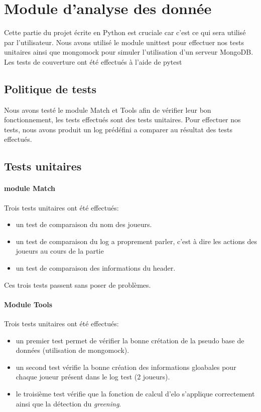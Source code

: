 \section{Module d'analyse des donnée}
Cette partie du projet écrite en Python est cruciale car c'est ce qui sera utilisé par l'utilisateur. Nous avons utilisé le module unittest pour effectuer nos tests unitaires ainsi que mongomock pour simuler l'utilisation d'un serveur MongoDB. Les tests de couverture ont été effectués à l'aide de pytest

\subsection{Politique de tests}
Nous avons testé le module Match et Tools afin de vérifier leur bon fonctionnement, les tests effectués sont des tests unitaires. Pour effectuer nos tests, nous avons produit un log prédéfini a comparer au résultat des tests effectués.

\subsection{Tests unitaires}
\paragraph{module Match}
Trois tests unitaires ont été effectués:
\begin{itemize}
\item un test de comparaison du nom des joueurs.
\item un test de comparaison du log a proprement parler, c'est à dire les actions des joueurs au cours de la partie
\item un test de comparaison des informations du header.
\end{itemize}

Ces trois tests passent sans poser de problèmes.

\paragraph{Module Tools}
Trois tests unitaires ont été effectués:
\begin{itemize}
\item un premier test permet de vérifier la bonne crétation de la pseudo base de données (utilisation de mongomock).
\item un second test vérifie la bonne création des informations gloabales pour chaque joueur présent dans le log test (2 joueurs).
\item le troisième test vérifie que la fonction de calcul d'elo s'applique correctement ainsi que la détection du \textit{greening}.
\end{itemize}

